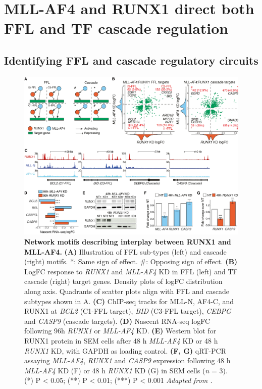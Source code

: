 \section{\label{ch4:ma4-runx1}MLL-AF4 and RUNX1 direct both FFL and TF cascade regulation}

\subsection{Identifying FFL and cascade regulatory circuits}

\begin{figure}[!t]
    \centering
    \includegraphics[width=\textwidth,height=\textheight,keepaspectratio]{figures/chapter4/chr4_grn-motifs.png}
    \caption[{Network motifs describing interplay between RUNX1 and MLL-AF4.}]
    {\textbf{Network motifs describing interplay between RUNX1 and MLL-AF4.} 
    \textbf{(A)} Illustration of FFL sub-types (left) and cascade (right) motifs. *: Same sign of effect. \#: Opposing sign of effect.
    \textbf{(B)} LogFC response to \textit{RUNX1} and \textit{MLL-AF4} KD in FFL (left) and TF cascade (right) target genes. Density plots of logFC distribution along axis. Quadrants of scatter plots align with FFL and cascade subtypes shown in A.
    \textbf{(C)} ChIP-seq tracks for MLL-N, AF4-C, and RUNX1 at \textit{BCL2} (C1-FFL target), \textit{BID} (C3-FFL target), \textit{CEBPG} and \textit{CASP9} (cascade targets). 
    \textbf{(D)} Nascent RNA-seq logFC following 96h \textit{RUNX1} or \textit{MLL-AF4} KD.
    \textbf{(E)} Western blot for RUNX1 protein in SEM cells after 48 h \textit{MLL-AF4} KD or 48 h \textit{RUNX1} KD, with GAPDH as loading control. 
    \textbf{(F, G)} qRT-PCR assaying \textit{MLL-AF4}, \textit{RUNX1} and \textit{CASP9} expression following 48 h \textit{MLL-AF4} KD (F) or 48 h \textit{RUNX1} KD (G) in SEM cells (\textit{n} = 3). 
    (*) P < 0.05; (**) P < 0.01; (***) P < 0.001
    \textit{Adapted from \cite{harman_kmt2a-aff1_2021}.}
    }
    \label{fig:ch4_motifs}
\end{figure}

